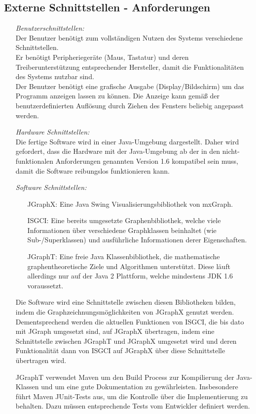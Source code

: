 \documentclass[11pt,a4paper]{article}
\begin{document}
	\subsection{Externe Schnittstellen - Anforderungen} %
	\begin{itemize}
	\item[] \textit{Benutzerschnittstellen:}\\
	Der Benutzer benötigt zum vollständigen Nutzen des Systems verschiedene Schnittstellen.\\
	Er benötigt Peripheriegeräte (Maus, Tastatur) und deren Treiberunterstützung entsprechender Hersteller, damit die Funktionalitäten des Systems nutzbar sind.\\
	Der Benutzer benötigt eine grafische Ausgabe (Display/Bildschirm) um das Programm anzeigen lassen zu können. Die Anzeige kann gemäß der benutzerdefinierten Auflösung durch Ziehen des Fensters beliebig angepasst werden.
	\item[] \textit{Hardware Schnittstellen:}\\
	Die fertige Software wird in einer Java-Umgebung dargestellt. Daher wird gefordert, dass die Hardware mit der Java-Umgebung ab der in den nicht-funktionalen Anforderungen genannten Version 1.6 kompatibel sein muss, damit die Software reibungslos funktionieren kann.
	\item[] \textit{Software Schnittstellen:}
	\begin{itemize}
	\item[JGraphX:] Eine Java Swing Visualisierungsbibliothek von mxGraph. 
	\item[ISGCI:] Eine bereits umgesetzte Graphenbibliothek, welche viele Informationen über verschiedene Graphklassen beinhaltet (wie Sub-/Superklassen) und ausführliche Informationen derer Eigenschaften.
	\item[JGraphT:] Eine freie Java Klassenbibliothek, die mathematische graphentheoretische Ziele und Algorithmen unterstützt. Diese läuft allerdings nur auf der Java 2 Plattform, welche mindestens JDK 1.6 voraussetzt.
 	\end{itemize}
	Die Software wird eine Schnittstelle zwischen diesen %
Bibliotheken bilden, indem die \newline Graphzeichnungsmöglichkeiten von JGraphX genutzt werden. Dementsprechend werden die aktuellen Funktionen von ISGCI, die bis dato mit JGraph umgesetzt sind, auf JGraphX übertragen, indem eine Schnittstelle zwischen JGraphT und JGraphX umgesetzt wird und deren Funktionalität dann von ISGCI auf JGraphX über diese Schnittstelle übertragen wird. 
	
	JGraphT verwendet Maven um den Build Process zur Kompilierung der Java-Klassen und um eine gute Dokumentation zu gewährleisten. Insbesondere führt Maven JUnit-Tests aus, um die Kontrolle über die Implementierung zu behalten. Dazu müssen entsprechende Tests vom Entwickler definiert werden.
	\end{itemize}
	
\end{document}
